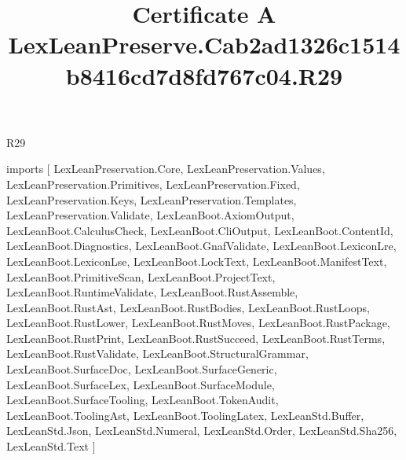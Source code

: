\begin{lexlean}{R29}
\title{Certificate A LexLeanPreserve.Cab2ad1326c1514b8416cd7d8fd767c04.R29}
\begin{coremodule}
imports [
  LexLeanPreservation.Core,
  LexLeanPreservation.Values,
  LexLeanPreservation.Primitives,
  LexLeanPreservation.Fixed,
  LexLeanPreservation.Keys,
  LexLeanPreservation.Templates,
  LexLeanPreservation.Validate,
  LexLeanBoot.AxiomOutput,
  LexLeanBoot.CalculusCheck,
  LexLeanBoot.CliOutput,
  LexLeanBoot.ContentId,
  LexLeanBoot.Diagnostics,
  LexLeanBoot.GnafValidate,
  LexLeanBoot.LexiconLre,
  LexLeanBoot.LexiconLse,
  LexLeanBoot.LockText,
  LexLeanBoot.ManifestText,
  LexLeanBoot.PrimitiveScan,
  LexLeanBoot.ProjectText,
  LexLeanBoot.RuntimeValidate,
  LexLeanBoot.RustAssemble,
  LexLeanBoot.RustAst,
  LexLeanBoot.RustBodies,
  LexLeanBoot.RustLoops,
  LexLeanBoot.RustLower,
  LexLeanBoot.RustMoves,
  LexLeanBoot.RustPackage,
  LexLeanBoot.RustPrint,
  LexLeanBoot.RustSucceed,
  LexLeanBoot.RustTerms,
  LexLeanBoot.RustValidate,
  LexLeanBoot.StructuralGrammar,
  LexLeanBoot.SurfaceDoc,
  LexLeanBoot.SurfaceGeneric,
  LexLeanBoot.SurfaceLex,
  LexLeanBoot.SurfaceModule,
  LexLeanBoot.SurfaceTooling,
  LexLeanBoot.TokenAudit,
  LexLeanBoot.ToolingAst,
  LexLeanBoot.ToolingLatex,
  LexLeanStd.Buffer,
  LexLeanStd.Json,
  LexLeanStd.Numeral,
  LexLeanStd.Order,
  LexLeanStd.Sha256,
  LexLeanStd.Text
]


\end{coremodule}
\end{lexlean}
